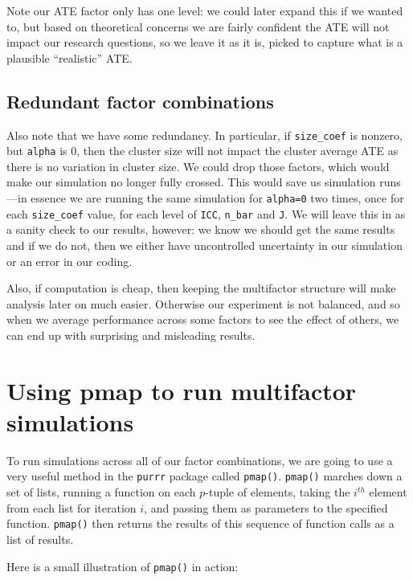 \documentclass[
]{book}
\begin{document}
Note our ATE factor only has one level: we could later expand this if we wanted to, but based on theoretical concerns we are fairly confident the ATE will not impact our research questions, so we leave it as it is, picked to capture what is a plausible ``realistic'' ATE.

\subsection{Redundant factor combinations}\label{redundant-factor-combinations}

Also note that we have some redundancy.
In particular, if \texttt{size\_coef} is nonzero, but \texttt{alpha} is 0, then the cluster size will not impact the cluster average ATE as there is no variation in cluster size.
We could drop those factors, which would make our simulation no longer fully crossed.
This would save us simulation runs---in essence we are running the same simulation for \texttt{alpha=0} two times, once for each \texttt{size\_coef} value, for each level of \texttt{ICC}, \texttt{n\_bar} and \texttt{J}.
We will leave this in as a sanity check to our results, however: we know we should get the same results and if we do not, then we either have uncontrolled uncertainty in our simulation or an error in our coding.

Also, if computation is cheap, then keeping the multifactor structure will make analysis later on much easier.
Otherwise our experiment is not balanced, and so when we average performance across some factors to see the effect of others, we can end up with surprising and misleading results.

\section{Using pmap to run multifactor simulations}\label{using-pmap-to-run-multifactor-simulations}

To run simulations across all of our factor combinations, we are going to use a very useful method in the \texttt{purrr} package called \texttt{pmap()}.
\texttt{pmap()} marches down a set of lists, running a function on each \(p\)-tuple of elements, taking the \(i^{th}\) element from each list for iteration \(i\), and passing them as parameters to the specified function.
\texttt{pmap()} then returns the results of this sequence of function calls as a list of results.

Here is a small illustration of \texttt{pmap()} in action:
\end{document}
